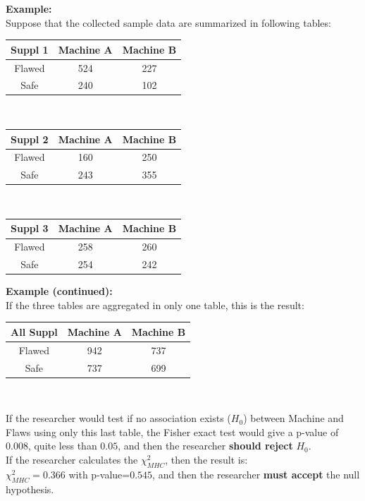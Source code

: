 \begin{frame}
  \textbf{Example:}\\
  Suppose that the collected sample data are summarized in following tables:\\
  \vspace{0.25cm}
  \begin{center}
    \begin{tabular}{c|c|c}
      \textbf{Suppl 1}& Machine A & Machine B \\
      \hline
      Flawed&524&227\\
      \hline
      Safe&240&102\\
      \hline
    \end{tabular}\\
    \vspace{0.5cm}
    \begin{tabular}{c|c|c}
      \textbf{Suppl 2}& Machine A & Machine B \\
      \hline
      Flawed&160&250\\
      \hline
      Safe&243&355\\
      \hline
    \end{tabular}\\
    \vspace{0.5cm}
    \begin{tabular}{c|c|c}
      \textbf{Suppl 3} & Machine A & Machine B \\
      \hline
      Flawed&258&260\\
      \hline
      Safe&254&242\\
      \hline
    \end{tabular}
  \end{center}
\end{frame}


\begin{frame}
  \textbf{Example (continued):}\\
  If the three tables are aggregated in only one table, this is the result:\\
  \vspace{0.15cm}
  \begin{center}
    \begin{tabular}{c|c|c}
      \textbf{All Suppl}& Machine A & Machine B \\
      \hline
      Flawed&942&737\\
      \hline
      Safe&737&699\\
      \hline
    \end{tabular}\\
  \end{center}
  \vspace{.15cm}  
  If the researcher would test if no association exists ($H_0$) between Machine and Flaws using only this last table, the Fisher exact test would give a p-value of $0.008$, quite less than $0.05$, and then the researcher \textbf{should reject} $H_0$.\\
  \vspace{.15cm}
  If the researcher calculates the $\chi^2_{MHC}$, then the result is:\\
  $\chi^2_{MHC}=0.366$ with p-value=$0.545$, and then the researcher \textbf{must accept} the null hypothesis.
\end{frame}

